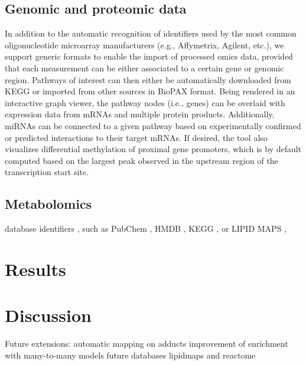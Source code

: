 \documentclass[final,5p,times,twocolumn]{elsarticle}
\begin{document}
\subsection{Genomic and proteomic data}
In addition to the automatic recognition of identifiers used by the most common oligonucleotide microarray manufacturers (e.g., Affymetrix, Agilent, etc.), we support generic formats to enable the import of processed omics data, provided that each measurement can be either associated to a certain gene or genomic region. Pathways of interest can then either be automatically downloaded from KEGG or imported from other sources in BioPAX format. Being rendered in an interactive graph viewer, the pathway nodes (i.e., genes) can be overlaid with expression data from mRNAs and multiple protein products. Additionally, miRNAs can be connected to a given pathway based on experimentally confirmed or predicted interactions to their target mRNAs. If desired, the tool also visualizes differential methylation of proximal gene promoters, which is by default computed based on the largest peak observed in the upstream region of the transcription start site.

\subsection{Metabolomics}
database identifiers , such as PubChem \cite{Wang2009}, HMDB \cite{Wishart2009}, KEGG \cite{Kanehisa2006}, or LIPID MAPS \cite{Sud2007},
\section{Results}

\section{Discussion}
Future extensions: automatic mapping on adducts
improvement of enrichment with many-to-many models
future databases lipidmaps\cite{Sud2007} and reactome \cite{Eustachio2011}


\end{document}
